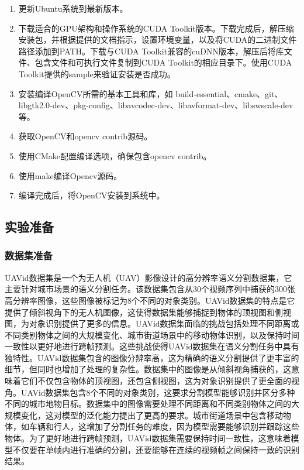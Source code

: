\begin{enumerate}
\item 更新Ubuntu系统到最新版本。
\item 下载适合的GPU架构和操作系统的CUDA Toolkit版本。下载完成后，解压缩安装包，并根据提供的文档指示，设置环境变量，以及将CUDA的二进制文件路径添加到PATH。下载与CUDA Toolkit兼容的cuDNN版本，解压后将库文件、包含文件和可执行文件复制到CUDA Toolkit的相应目录下。使用CUDA Toolkit提供的sample来验证安装是否成功。
\item 安装编译OpenCV所需的基本工具和库，如 build-essential、cmake、git、libgtk2.0-dev、pkg-config、libavcodec-dev、libavformat-dev、libswscale-dev 等。
\item 获取OpenCV和opencv contrib源码。
\item 使用CMake配置编译选项，确保包含opencv contrib。
\item 使用make编译Opencv源码。
\item 编译完成后，将OpenCV安装到系统中。
\end{enumerate}

\subsection{实验准备}
\subsubsection{数据集准备}

UAVid数据集是一个为无人机（UAV）影像设计的高分辨率语义分割数据集，它主要针对城市场景的语义分割任务。该数据集包含从30个视频序列中捕获的300张高分辨率图像，这些图像被标记为8个不同的对象类别。UAVid数据集的特点是它提供了倾斜视角下的无人机图像，这使得数据集能够捕捉到物体的顶视图和侧视图，为对象识别提供了更多的信息。UAVid数据集面临的挑战包括处理不同距离或不同类别物体之间的大规模变化、城市街道场景中的移动物体识别，以及保持时间一致性以更好地进行跨帧预测。这些挑战使得UAVid数据集在语义分割任务中具有独特性。UAVid数据集包含的图像分辨率高，这为精确的语义分割提供了更丰富的细节，但同时也增加了处理的复杂性。数据集中的图像是从倾斜视角捕获的，这意味着它们不仅包含物体的顶视图，还包含侧视图，这为对象识别提供了更全面的视角。UAVid数据集包含8个不同的对象类别，这要求分割模型能够识别并区分多种不同的城市地物目标。数据集中的图像需要处理不同距离和不同类别物体之间的大规模变化，这对模型的泛化能力提出了更高的要求。城市街道场景中包含移动物体，如车辆和行人，这增加了分割任务的难度，因为模型需要能够识别并跟踪这些物体。为了更好地进行跨帧预测，UAVid数据集需要保持时间一致性，这意味着模型不仅要在单帧内进行准确的分割，还要能够在连续的视频帧之间保持一致的识别结果。

